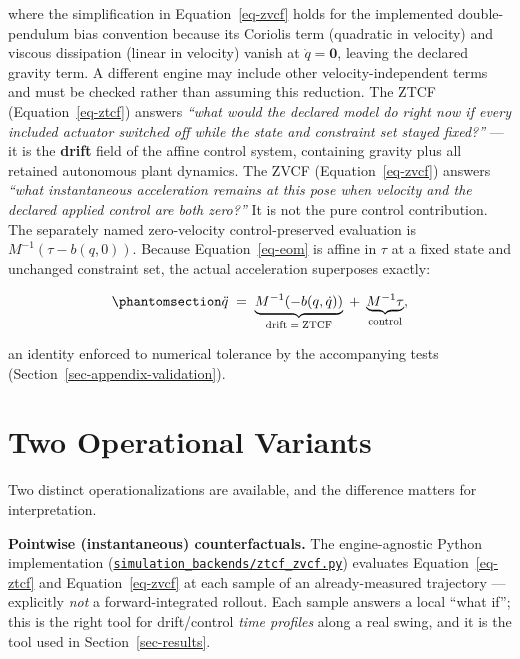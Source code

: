 \documentclass[
  letterpaper,
]{report}
\begin{document}
where the simplification in Equation~\ref{eq-zvcf} holds for the
implemented double-pendulum bias convention because its Coriolis term
(quadratic in velocity) and viscous dissipation (linear in velocity)
vanish at \(\dot q = \mathbf 0\), leaving the declared gravity term. A
different engine may include other velocity-independent terms and must
be checked rather than assuming this reduction. The ZTCF
(Equation~\ref{eq-ztcf}) answers \emph{``what would the declared model
do right now if every included actuator switched off while the state and
constraint set stayed fixed?''} --- it is the \textbf{drift} field of
the affine control system, containing gravity plus all retained
autonomous plant dynamics. The ZVCF (Equation~\ref{eq-zvcf}) answers
\emph{``what instantaneous acceleration remains at this pose when
velocity and the declared applied control are both zero?''} It is not
the pure control contribution. The separately named zero-velocity
control-preserved evaluation is \(M^{-1}(\tau-b(q,0))\). Because
Equation~\ref{eq-eom} is affine in \(\tau\) at a fixed state and
unchanged constraint set, the actual acceleration superposes exactly:

\begin{equation}\phantomsection\label{eq-superposition}{
\ddot q \;=\;
\underbrace{M^{-1}(-b(q,\dot q))}_{\text{drift}\;=\;\text{ZTCF}}
\;+\;
\underbrace{M^{-1}\tau}_{\text{control}},
}\end{equation}

an identity enforced to numerical tolerance by the accompanying tests
(Section~\ref{sec-appendix-validation}).

\section{Two Operational Variants}\label{sec-ztcf-variants}

Two distinct operationalizations are available, and the difference
matters for interpretation.

\textbf{Pointwise (instantaneous) counterfactuals.} The engine-agnostic
Python implementation
(\href{https://github.com/D-sorganization/UpstreamDrift/blob/main/src/shared/python/simulation_backends/ztcf_zvcf.py}{\texttt{simulation\_backends/ztcf\_zvcf.py}})
evaluates Equation~\ref{eq-ztcf} and Equation~\ref{eq-zvcf} at each
sample of an already-measured trajectory --- explicitly \emph{not} a
forward-integrated rollout. Each sample answers a local ``what if'';
this is the right tool for drift/control \emph{time profiles} along a
real swing, and it is the tool used in Section~\ref{sec-results}.
\end{document}
